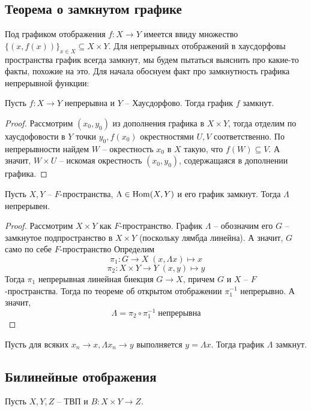 \documentclass[12pt, a4paper, oneside]{book}
\begin{document}
\subsection{Теорема о замкнутом графике}
Под графиком отображения $f: X \to Y$ имеется ввиду множество $\{(x,f(x))\}_{x \in X} \subseteq X \times Y$. Для непрерывных отображений в хаусдорфовы пространства график всегда замкнут, мы будем пытаться выяснить про какие-то факты, похожие на это.
Для начала обоснуем факт про замкнутность графика непрерывной функции:
\begin{remark}
Пусть $f:X \to Y$ непрерывна и $Y$ -- Хаусдорфово. Тогда график $f$ замкнут.
\end{remark}
\begin{proof}
Рассмотрим $(x_0, y_0)$ из дополнения графика в $X \times Y$, тогда отделим по хаусдофовости в $Y$ точки $y_0, f(x_0)$ окрестностями $U, V$ соответственно.
По непрерывности найдем $W$ -- окрестность $x_0$ в $X$ такую, что $f(W) \subseteq V$. А значит, $W \times U$ -- искомая окрестность $(x_0, y_0)$, содержащаяся в дополнении графика.
\end{proof}

\begin{theorem}
    Пусть $X,Y$ -- $F$-пространства, $\Lambda \in \operatorname{Hom}(X,Y)$ и его график замкнут. Тогда $\Lambda$ непрерывен.
\end{theorem}

\begin{proof}
    Рассмотрим $X\times Y$ как $F$-пространство.
График $\Lambda$ -- обозначим его $G$ -- замкнутое подпространство в $X\times Y$ (поскольку лямбда линейна). А значит, $G$ само по себе $F$-пространство
    Определим $$\pi_1: G \to X\; (x,\Lambda x) \mapsto x$$
    $$\pi_2: X\times Y \to Y\; (x,y) \mapsto y$$
    Тогда $\pi_1$ непрерывная линейная биекция $G\to X$, причем $G$ и $X$ -- $F$-пространства. Тогда по теореме об открытом отображении $\pi_1^{-1}$ непрерывно. А значит,
     $$\Lambda = \pi_2 \circ \pi_1^{-1} \; \text{непрерывна}$$
\end{proof}

\begin{remark}
Пусть для всяких $x_n \to x, \Lambda x_n \to y$ выполняется $y = \Lambda x$. Тогда график $\Lambda$ замкнут.
\end{remark}

\subsection{Билинейные отображения}
Пусть $X,Y,Z$ -- ТВП и $B: X\times Y \to Z$.
\end{document}
